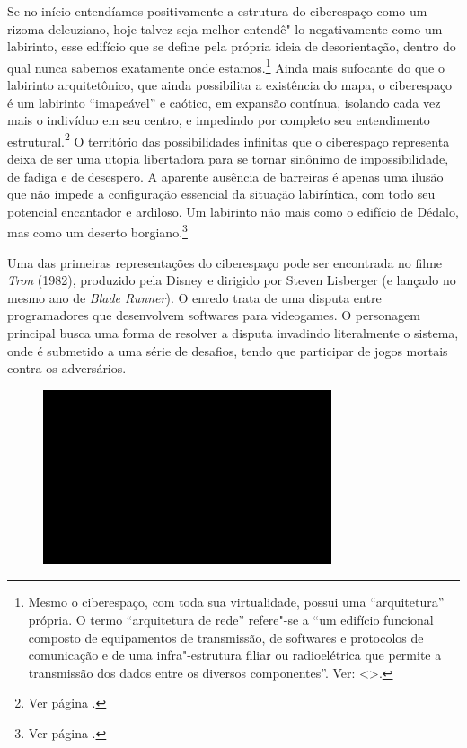 Se no início entendíamos positivamente a estrutura do ciberespaço como
um rizoma deleuziano, hoje talvez seja melhor entendê"-lo
negativamente como um labirinto, esse edifício que se define pela
própria ideia de desorientação, dentro do qual nunca sabemos exatamente
onde estamos.\footnote{Mesmo o ciberespaço, com toda sua virtualidade,
  possui uma ``arquitetura'' própria. O termo ``arquitetura de rede''
  refere"-se a ``um edifício funcional composto de equipamentos de
  transmissão, de softwares e protocolos de comunicação e de uma
  infra"-estrutura filiar ou radioelétrica que permite a transmissão dos
  dados entre os diversos componentes''. Ver: \textless{}{}\textgreater{}.} Ainda
mais sufocante do que o labirinto arquitetônico, que ainda possibilita a
existência do mapa, o ciberespaço é um labirinto ``imapeável'' e
caótico, em expansão contínua, isolando cada vez mais o indivíduo em seu
centro, e impedindo por completo seu entendimento estrutural.\footnote{Ver
  página .} O território das possibilidades infinitas que o
ciberespaço representa deixa de ser uma utopia libertadora para se
tornar sinônimo de impossibilidade, de fadiga e de desespero. A aparente ausência
de barreiras é apenas uma ilusão que não impede a configuração
essencial da situação labiríntica, com todo seu potencial encantador e
ardiloso. Um labirinto não mais como o edifício de Dédalo, mas como um
deserto borgiano.\footnote{Ver página \pageref{borges}.}

Uma das primeiras representações do ciberespaço pode ser encontrada no
filme \emph{Tron} (1982), produzido pela Disney e dirigido por Steven
Lisberger (e lançado no mesmo ano de \emph{Blade Runner}). O enredo
trata de uma disputa entre programadores que desenvolvem softwares para
videogames. O personagem principal busca uma forma de resolver a disputa
invadindo literalmente o sistema, onde é submetido a uma série de
desafios, tendo que participar de jogos mortais contra os adversários.

\begin{figure}[!ht]

\centering
 \includegraphics[width=85mm]{./imgs/im1.jpg}
\caption{\tiny{}}

\end{figure}


